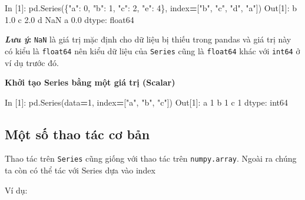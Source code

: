 \documentclass[
]{book}
\makeatletter
\newenvironment{Shaded}{\begin{snugshade}}{\end{snugshade}}
\newcommand{\DecValTok}[1]{\textcolor[rgb]{0.00,0.00,0.81}{#1}}
\newcommand{\FloatTok}[1]{\textcolor[rgb]{0.00,0.00,0.81}{#1}}
\newcommand{\NormalTok}[1]{#1}
\newcommand{\OperatorTok}[1]{\textcolor[rgb]{0.81,0.36,0.00}{\textbf{#1}}}
\newcommand{\StringTok}[1]{\textcolor[rgb]{0.31,0.60,0.02}{#1}}
\newenvironment{kframe}{%
\medskip{}
\setlength{\fboxsep}{.8em}
 \def\at@end@of@kframe{}%
 \ifinner\ifhmode%
  \def\at@end@of@kframe{\end{minipage}}%
  \begin{minipage}{\columnwidth}%
 \fi\fi%
 \def\FrameCommand##1{\hskip\@totalleftmargin \hskip-\fboxsep
 \colorbox{shadecolor}{##1}\hskip-\fboxsep
     \hskip-\linewidth \hskip-\@totalleftmargin \hskip\columnwidth}%
 \MakeFramed {\advance\hsize-\width
   \@totalleftmargin\z@ \linewidth\hsize
   \@setminipage}}%
 {\par\unskip\endMakeFramed%
 \at@end@of@kframe}
\newenvironment{rmdblock}[1]
  {
  \begin{itemize}
  \renewcommand{\labelitemi}{
    \raisebox{-.7\height}[0pt][0pt]{
      {\setkeys{Gin}{width=3em,keepaspectratio}\texttt{[image: images/\#1]}}
    }
  }
  \setlength{\fboxsep}{1em}
  \begin{kframe}
  \item
  }
  {
  \end{kframe}
  \end{itemize}
  }
\newenvironment{rmdnote}
  {\begin{rmdblock}{note}}
  {\end{rmdblock}}
\makeatother
\begin{document}
\begin{Shaded}
\begin{Highlighting}[]
\NormalTok{In [}\DecValTok{1}\NormalTok{]: pd.Series(\{}\StringTok{"a"}\NormalTok{: }\DecValTok{0}\NormalTok{, }\StringTok{"b"}\NormalTok{: }\DecValTok{1}\NormalTok{, }\StringTok{"c"}\NormalTok{: }\DecValTok{2}\NormalTok{, }\StringTok{"e"}\NormalTok{: }\DecValTok{4}\NormalTok{\}, index}\OperatorTok{=}\NormalTok{[}\StringTok{"b"}\NormalTok{, }\StringTok{"c"}\NormalTok{, }\StringTok{"d"}\NormalTok{, }\StringTok{"a"}\NormalTok{])}
\NormalTok{Out[}\DecValTok{1}\NormalTok{]: }
\NormalTok{b    }\FloatTok{1.0}
\NormalTok{c    }\FloatTok{2.0}
\NormalTok{d    NaN}
\NormalTok{a    }\FloatTok{0.0}
\NormalTok{dtype: float64}
\end{Highlighting}
\end{Shaded}

\begin{rmdnote}
\textbf{\emph{Lưu ý}:}
\texttt{NaN} là giá trị mặc định cho dữ liệu bị thiếu trong pandas và giá trị này có kiểu
là \texttt{float64} nên kiểu dữ liệu của \texttt{Series} cũng là \texttt{float64} khác với \texttt{int64} ở ví dụ trước đó.
\end{rmdnote}

\textbf{Khởi tạo Series bằng một giá trị (Scalar)}

\begin{Shaded}
\begin{Highlighting}[]
\NormalTok{In [}\DecValTok{1}\NormalTok{]: pd.Series(data}\OperatorTok{=}\DecValTok{1}\NormalTok{, index}\OperatorTok{=}\NormalTok{[}\StringTok{"a"}\NormalTok{, }\StringTok{"b"}\NormalTok{, }\StringTok{"c"}\NormalTok{])}
\NormalTok{Out[}\DecValTok{1}\NormalTok{]: }
\NormalTok{a    }\DecValTok{1}
\NormalTok{b    }\DecValTok{1}
\NormalTok{c    }\DecValTok{1}
\NormalTok{dtype: int64}
\end{Highlighting}
\end{Shaded}

\hypertarget{mux1ed9t-sux1ed1-thao-tuxe1c-cux1a1-bux1ea3n}{%
\subsection{Một số thao tác cơ bản}\label{mux1ed9t-sux1ed1-thao-tuxe1c-cux1a1-bux1ea3n}}

Thao tác trên \texttt{Series} cũng giống với thao tác trên \texttt{numpy.array}. Ngoài ra chúng ta còn có thể
tác với Series dựa vào index

Ví dụ:
\end{document}

